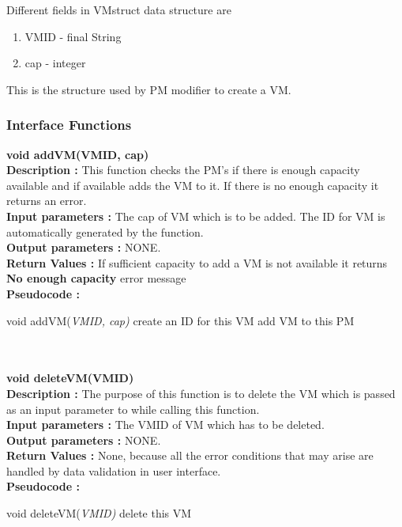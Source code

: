 \documentclass[a4paper,11pt]{article}
\begin{document}
Different fields in VMstruct data structure are
\begin{enumerate}
 \item VM\textunderscore ID - final String
 \item cap - integer
\end{enumerate}
This is the structure used by PM modifier to create a VM.
\subsubsection{Interface Functions}
\textbf{void addVM(VM\textunderscore ID, cap)}
\\
\textbf{Description :} This function checks the PM's if there is enough capacity available and if available adds the VM to it. If there is no enough capacity 
it returns an error.
\\
\textbf{Input parameters :} The cap of VM which is to be added. The ID for VM is automatically generated by the function.
\\
\textbf{Output parameters :} NONE.
\\
\textbf{Return Values :} If sufficient capacity to add a VM is not available it returns \textbf{No enough capacity} error message
\\
\textbf{Pseudocode :}
\begin{algorithmic}[1]
\STATE void addVM(\emph{VM\textunderscore ID, cap)}
\STATE create an ID for this VM
\STATE add VM to this PM
\ENDIF
\ENDFOR
\end{algorithmic}
\mbox{}\\\\
\textbf{void deleteVM(VM\textunderscore ID)}
\\
\textbf{Description :} The purpose of this function is to delete the VM which is passed as an input parameter to while calling this function.
\\
\textbf{Input parameters :} The VM\textunderscore ID of VM which has to be deleted.
\\
\textbf{Output parameters :} NONE.
\\
\textbf{Return Values :} None, because all the error conditions that may arise are handled by data validation in user interface.
\\
\textbf{Pseudocode :}
\begin{algorithmic}[1]
\STATE void deleteVM(\emph{VM\textunderscore ID)}
\STATE delete this VM
\ENDIF
\ENDFOR
\ENDFOR
\end{algorithmic}
\end{document}
